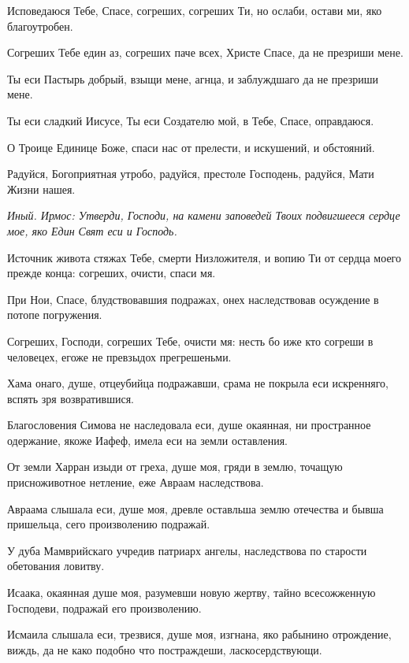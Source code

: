 Исповедаюся Тебе, Спасе, согреших, согреших Ти, но ослаби, остави ми, яко благоутробен.


Согреших Тебе един аз, согреших паче всех, Христе Спасе, да не презриши мене.


Ты еси Пастырь добрый, взыщи мене, агнца, и заблуждшаго да не презриши мене.

Ты еси сладкий Иисусе, Ты еси Создателю мой, в Тебе, Спасе, оправдаюся.




О Троице Единице Боже, спаси нас от прелести, и искушений, и обстояний.



Радуйся, Богоприятная утробо, радуйся, престоле Господень, радуйся, Мати Жизни нашея.


\itshape Иный. Ирмос\normalfont{}: Утверди, Господи, на камени заповедей Твоих подвигшееся сердце мое, яко Един Свят еси и Господь.


Источник живота стяжах Тебе, смерти Низложителя, и вопию Ти от сердца моего прежде конца: согреших, очисти, спаси мя.


При Нои, Спасе, блудствовавшия подражах, онех наследствовав осуждение в потопе погружения.


Согреших, Господи, согреших Тебе, очисти мя: несть бо иже кто согреши в человецех, егоже не превзыдох прегрешеньми.


Хама онаго, душе, отцеубийца подражавши, срама не покрыла еси искренняго, вспять зря возвратившися.


Благословения Симова не наследовала еси, душе окаянная, ни пространное одержание, якоже Иафеф, имела еси на земли оставления.


От земли Харран изыди от греха, душе моя, гряди в землю, точащую присноживотное нетление, еже Авраам наследствова.


Авраама слышала еси, душе моя, древле оставльша землю отечества и бывша пришельца, сего произволению подражай.


У дуба Мамврийскаго учредив патриарх ангелы, наследствова по старости обетования ловитву.


Исаака, окаянная душе моя, разумевши новую жертву, тайно всесожженную Господеви, подражай его произволению.


Исмаила слышала еси, трезвися, душе моя, изгнана, яко рабынино отрождение, виждь, да не како подобно что постраждеши, ласкосердствующи.


